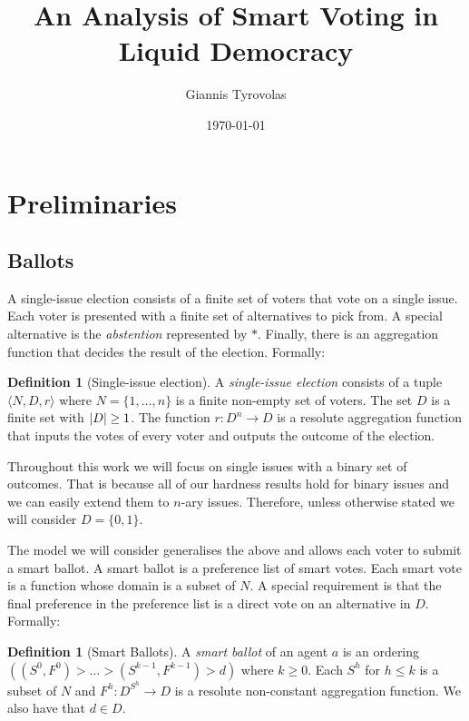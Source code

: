 \documentclass[11pt,a4paper, titlepage]{article}
\title{An Analysis of Smart Voting in Liquid Democracy}
\author{Giannis Tyrovolas}
\date{\today}
\DeclarePairedDelimiter\abs{\lvert}{\rvert}
\theoremstyle{definition}
\newtheorem{definition}[theorem]{Definition}
\begin{document}
\maketitle

\tableofcontents

\newpage

\section{Preliminaries}

\subsection{Ballots}

A single-issue election consists of a finite set of voters that vote on a single issue. 
Each voter is presented with a finite set of alternatives to pick from. 
A special alternative is the \emph{abstention} represented by $*$. 
Finally, there is an aggregation function that decides the result of the election. 
Formally:

\begin{definition}[Single-issue election]
    A \emph{single-issue election} consists of a tuple $\langle N, D, r\rangle $ where $N = \{1,..., n\} $ is a finite non-empty set of voters. The set $D$ is a finite set with $\abs{D} \geq 1$. The function $r \colon D^n \longrightarrow D$ is a resolute aggregation function that inputs the votes of every voter and outputs the outcome of the election.
\end{definition}

Throughout this work we will focus on single issues with a binary set of outcomes. 
That is because all of our hardness results hold for binary issues and we can easily extend them to $n$-ary issues. 
Therefore, unless otherwise stated we will consider $D = \{0, 1\}$.

The model we will consider generalises the above and allows each voter to submit a smart ballot. 
A smart ballot is a preference list of smart votes. 
Each smart vote is a function whose domain is a subset of $N$. 
A special requirement is that the final preference in the preference list is a direct vote on an alternative in $D$. 
Formally:

\begin{definition}[Smart Ballots]
    A \emph{smart ballot} of an agent $a$ is an ordering $( (S^0, F^0) > \ldots > (S^{k-1}, F^{k-1}) > d)$ where $k \geq 0$. Each $S^h$ for $h \leq k$ is a subset of $N$ and $F^h \colon D^{S^h} \longrightarrow D$ is a resolute non-constant aggregation function. We also have that $d \in D$.   
\end{definition}
\end{document}
